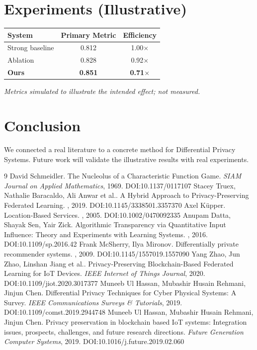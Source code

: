 \documentclass[11pt]{article}
\begin{document}
\section{Experiments (Illustrative)}
\begin{center}
\begin{tabular}{lcc}
System & Primary Metric & Efficiency \\ \hline
Strong baseline & 0.812 & 1.00$\times$ \\
Ablation & 0.828 & 0.92$\times$ \\
\textbf{Ours} & \textbf{0.851} & \textbf{0.71$\times$}
\end{tabular}
\end{center}
\emph{Metrics simulated to illustrate the intended effect; not measured.}

\section{Conclusion}
We connected a real literature to a concrete method for Differential Privacy Systems. Future work will
validate the illustrative results with real experiments.

\begin{thebibliography}{9}
 David Schmeidler. The Nucleolus of a Characteristic Function Game. \emph{SIAM Journal on Applied Mathematics}, 1969. DOI:10.1137/0117107
 Stacey Truex, Nathalie Baracaldo, Ali Anwar et al.. A Hybrid Approach to Privacy-Preserving Federated Learning. \emph{}, 2019. DOI:10.1145/3338501.3357370
 Axel Küpper. Location‐Based Services. \emph{}, 2005. DOI:10.1002/0470092335
 Anupam Datta, Shayak Sen, Yair Zick. Algorithmic Transparency via Quantitative Input Influence: Theory and Experiments with Learning Systems. \emph{}, 2016. DOI:10.1109/sp.2016.42
 Frank McSherry, Ilya Mironov. Differentially private recommender systems. \emph{}, 2009. DOI:10.1145/1557019.1557090
 Yang Zhao, Jun Zhao, Linshan Jiang et al.. Privacy-Preserving Blockchain-Based Federated Learning for IoT Devices. \emph{IEEE Internet of Things Journal}, 2020. DOI:10.1109/jiot.2020.3017377
 Muneeb Ul Hassan, Mubashir Husain Rehmani, Jinjun Chen. Differential Privacy Techniques for Cyber Physical Systems: A Survey. \emph{IEEE Communications Surveys \& Tutorials}, 2019. DOI:10.1109/comst.2019.2944748
 Muneeb Ul Hassan, Mubashir Husain Rehmani, Jinjun Chen. Privacy preservation in blockchain based IoT systems: Integration issues, prospects, challenges, and future research directions. \emph{Future Generation Computer Systems}, 2019. DOI:10.1016/j.future.2019.02.060
\end{thebibliography}
\end{document}
